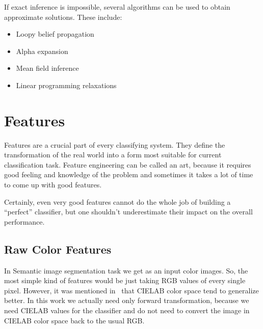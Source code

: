 If exact inference is impossible, several algorithms can be used to obtain approximate solutions. These include:
\begin{itemize}
  \item Loopy belief propagation
  \item Alpha expansion
  \item Mean field inference
  \item Linear programming relaxations
\end{itemize}

\section{Features}
\label{sec:features}
Features are a crucial part of every classifying system. They define the transformation of the real world into a form
most suitable for current classification task. Feature engineering can be called an art, because it requires good 
feeling and knowledge of the problem and sometimes it takes a lot of time to come up with good features.

Certainly, even very good features cannot do the whole job of building a ``perfect'' classifier, but one shouldn't underestimate 
their impact on the overall performance.

\subsection{Raw Color Features}
\label{raw_features}
In Semantic image segmentation task we get as an input color images. So, the most simple kind of features would be just taking
RGB values of every single pixel. However, it was mentioned in~\cite{Shotton2008, Shotton2009} that CIELAB color space
tend to generalize better. In this work we actually need only forward transformation, because we need CIELAB values for the
classifier and do not need to convert the image in CIELAB color space back to the usual RGB.

